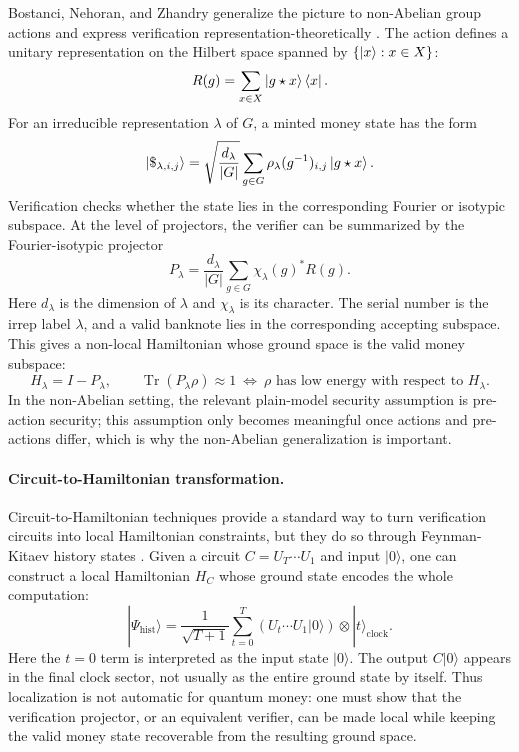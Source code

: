 \documentclass[12pt]{article}
\begin{document}
Bostanci, Nehoran, and Zhandry generalize the picture to non-Abelian group actions and express verification representation-theoretically \cite{bostanciGeneralQuantumDuality2025}.
The action defines a unitary representation on the Hilbert space spanned by $\{\ket{x}:x\in X\}$:
\[
R(g)=\sum_{x\in X}\ket{g\star x}\bra{x}.
\]
For an irreducible representation $\lambda$ of $G$, a minted money state has the form
\[
|\$_{\lambda,i,j}\rangle
=\sqrt{\frac{d_\lambda}{|G|}}
\sum_{g\in G}\rho_\lambda(g^{-1})_{i,j}\ket{g\star x}.
\]
Verification checks whether the state lies in the corresponding Fourier or isotypic subspace.
At the level of projectors, the verifier can be summarized by the Fourier-isotypic projector
\[
P_\lambda=\frac{d_\lambda}{|G|}
\sum_{g\in G}\chi_\lambda(g)^*R(g).
\]
Here $d_\lambda$ is the dimension of $\lambda$ and $\chi_\lambda$ is its character.
The serial number is the irrep label $\lambda$, and a valid banknote lies in the corresponding accepting subspace.
This gives a non-local Hamiltonian whose ground space is the valid money subspace:
\[
H_\lambda=I-P_\lambda,
\qquad
\operatorname{Tr}(P_\lambda\rho)\approx 1
\ \Longleftrightarrow\
\rho \text{ has low energy with respect to } H_\lambda.
\]
In the non-Abelian setting, the relevant plain-model security assumption is pre-action security; this assumption only becomes meaningful once actions and pre-actions differ, which is why the non-Abelian generalization is important.

\paragraph{Circuit-to-Hamiltonian transformation.}
Circuit-to-Hamiltonian techniques provide a standard way to turn verification circuits into local Hamiltonian constraints, but they do so through Feynman-Kitaev history states \cite{aharonovAdiabaticQuantumComputation2008}.
Given a circuit $C=U_T\cdots U_1$ and input $|0\rangle$, one can construct a local Hamiltonian $H_C$ whose ground state encodes the whole computation:
\[
|\Psi_{\mathrm{hist}}\rangle
=\frac{1}{\sqrt{T+1}}\sum_{t=0}^T
\left(U_t\cdots U_1|0\rangle\right)\otimes |t\rangle_{\mathrm{clock}}.
\]
Here the $t=0$ term is interpreted as the input state $|0\rangle$.
The output $C|0\rangle$ appears in the final clock sector, not usually as the entire ground state by itself.
Thus localization is not automatic for quantum money: one must show that the verification projector, or an equivalent verifier, can be made local while keeping the valid money state recoverable from the resulting ground space.
\end{document}
